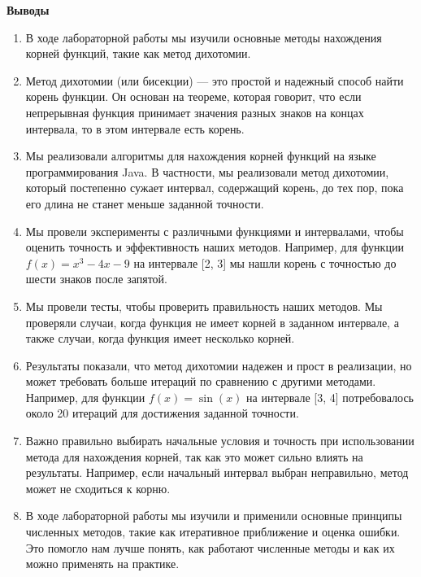 \textbf{Выводы}
\begin{enumerate}
    \item В ходе лабораторной работы мы изучили основные методы нахождения корней функций, такие как метод дихотомии.
    \item Метод дихотомии (или бисекции) — это простой и надежный способ найти корень функции. Он основан на теореме, которая говорит, что если непрерывная функция принимает значения разных знаков на концах интервала, то в этом интервале есть корень.
    \item Мы реализовали алгоритмы для нахождения корней функций на языке программирования Java. В частности, мы реализовали метод дихотомии, который постепенно сужает интервал, содержащий корень, до тех пор, пока его длина не станет меньше заданной точности.
    \item Мы провели эксперименты с различными функциями и интервалами, чтобы оценить точность и эффективность наших методов. Например, для функции \( f(x) = x^3 - 4x - 9 \) на интервале [2, 3] мы нашли корень с точностью до шести знаков после запятой.
    \item Мы провели тесты, чтобы проверить правильность наших методов. Мы проверяли случаи, когда функция не имеет корней в заданном интервале, а также случаи, когда функция имеет несколько корней.
    \item Результаты показали, что метод дихотомии надежен и прост в реализации, но может требовать больше итераций по сравнению с другими методами. Например, для функции \( f(x) = \sin(x) \) на интервале [3, 4] потребовалось около 20 итераций для достижения заданной точности.
    \item Важно правильно выбирать начальные условия и точность при использовании метода для нахождения корней, так как это может сильно влиять на результаты. Например, если начальный интервал выбран неправильно, метод может не сходиться к корню.
    \item В ходе лабораторной работы мы изучили и применили основные принципы численных методов, такие как итеративное приближение и оценка ошибки. Это помогло нам лучше понять, как работают численные методы и как их можно применять на практике.
\end{enumerate}